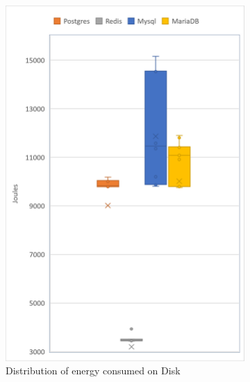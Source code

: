 \begin{figure}[h]
\begin{subfigure}[b]{0.325\textwidth}
            \includegraphics[width=1\columnwidth]{results/boxplot/Disk.png}
            \caption[Distribution of energy consumed on Disk]%
            {{\small Distribution of energy consumed on Disk}}    
            \label{fig:bocplotyenergydisk}
        \end{subfigure}
        \begin{subfigure}[b]{0.325\textwidth}   
            \centering 

\end{subfigure}
\end{figure}
